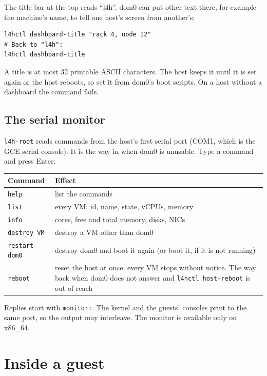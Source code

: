 \documentclass[11pt,a4paper]{report}
\newcommand{\cmd}[1]{\texttt{#1}}
\begin{document}
The title bar at the top reads ``l4h''. dom0 can put other text there, for
example the machine's name, to tell one host's screen from another's:
\begin{lstlisting}
l4hctl dashboard-title "rack 4, node 12"
# Back to "l4h":
l4hctl dashboard-title
\end{lstlisting}
A title is at most 32 printable ASCII characters. The host keeps it until
it is set again or the host reboots, so set it from dom0's boot scripts. On
a host without a dashboard the command fails.

\section{The serial monitor}

\texttt{l4h-root} reads commands from the host's first serial port (COM1,
which is the GCE serial console). It is the way in when dom0 is unusable.
Type a command and press Enter:

\begin{longtable}{@{}lp{10cm}@{}}
\toprule
Command & Effect \\
\midrule
\texttt{help} & list the commands \\
\texttt{list} & every VM: id, name, state, vCPUs, memory \\
\texttt{info} & cores, free and total memory, disks, NICs \\
\texttt{destroy VM} & destroy a VM other than dom0 \\
\texttt{restart-dom0} & destroy dom0 and boot it again (or boot it, if it
  is not running) \\
\texttt{reboot} & reset the host at once: every VM stops without notice.
  The way back when dom0 does not answer and \cmd{l4hctl host-reboot} is
  out of reach \\
\bottomrule
\end{longtable}

Replies start with \texttt{monitor:}. The kernel and the guests' consoles
print to the same port, so the output may interleave. The monitor is
available only on x86\_64.

\chapter{Inside a guest}
\label{ch:guest}
\end{document}
